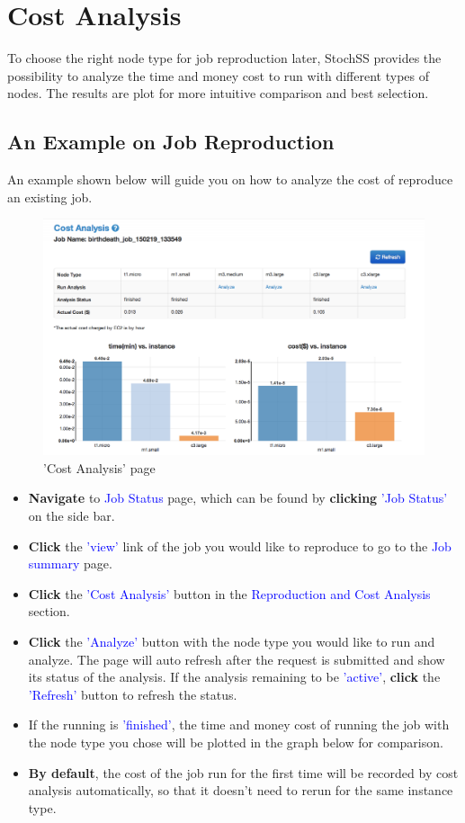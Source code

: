 \documentclass[12pt,notitlepage,nofootinbib]{revtex4}
\begin{document}
\newpage

\section{Cost Analysis}
To choose the right node type for job reproduction later, StochSS provides the possibility to analyze the time and money cost to run with different types of nodes. The results are plot for more intuitive comparison and best selection.

\subsection{An Example on Job Reproduction}
An example shown below will guide you on how to analyze the cost of reproduce an existing job.

\begin{figure}[!ht]
\centering
\includegraphics[scale=0.30]{T6_fig_costanalysis.png}
\caption{'Cost Analysis' page}
\label{fig:2}
\end{figure}

\begin{itemize}
\item \textbf{Navigate} to \textcolor{blue}{Job Status} page, which can be found by \textbf{clicking} \textcolor{blue}{'Job Status'} on the side bar.
\item \textbf{Click} the \textcolor{blue}{'view'} link of the job you would like to reproduce to go to the \textcolor{blue}{Job summary} page.
\item \textbf{Click} the \textcolor{blue}{'Cost Analysis'} button in the \textcolor{blue}{Reproduction and Cost Analysis} section.
\item \textbf{Click} the \textcolor{blue}{'Analyze'} button with the node type you would like to run and analyze. The page will auto refresh after the request is submitted and show its status of the analysis. If the analysis remaining to be \textcolor{blue}{'active'}, \textbf{click} the \textcolor{blue}{'Refresh'} button to refresh the status.
\item If the running is \textcolor{blue}{'finished'}, the time and money cost of running the job with the node type you chose will be plotted in the graph below for comparison.
\item \textbf{By default}, the cost of the job run for the first time will be recorded by cost analysis automatically, so that it doesn't need to rerun for the same instance type.
\end{itemize}
\end{document}

